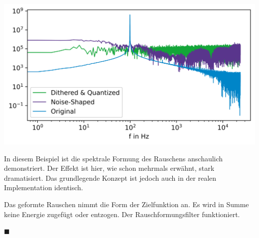 \includegraphics{./img/dd90f155bf8c245aa3acbf7b017e8970bb7bdab9.png}

In diesem Beispiel ist die spektrale Formung des Rauschens anschaulich
demonstriert. Der Effekt ist hier, wie schon mehrmals erwähnt, stark
dramatisiert. Das grundlegende Konzept ist jedoch auch in der realen
Implementation identisch.

Das geformte Rauschen nimmt die Form der Zielfunktion an. Es wird in
Summe keine Energie zugefügt oder entzogen. Der Rauschformungsfilter
funktioniert.

\hfill\(\blacksquare\)
